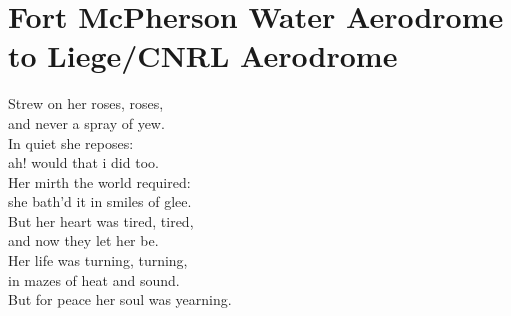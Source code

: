 \documentclass[smalldemyvopaper,11pt,twoside,onecolumn,openright,extrafontsizes]{memoir}
\begin{document}
\chapter{Fort McPherson Water Aerodrome to Liege/CNRL Aerodrome}
Strew on her roses, roses,
\\and never a spray of yew.
\\In quiet she reposes:
\\ah! would that i did too.
\\Her mirth the world required:
\\she bath'd it in smiles of glee.
\\But her heart was tired, tired,
\\and now they let her be.
\\Her life was turning, turning,
\\in mazes of heat and sound.
\\But for peace her soul was yearning.
\end{document}
